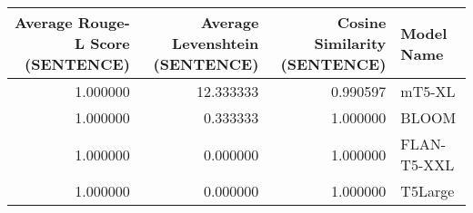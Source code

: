 \begin{tabular}{rrrl}
\toprule
Average Rouge-L Score (SENTENCE) & Average Levenshtein (SENTENCE) & Cosine Similarity (SENTENCE) & Model Name \\
\midrule
1.000000 & 12.333333 & 0.990597 & mT5-XL \\
1.000000 & 0.333333 & 1.000000 & BLOOM \\
1.000000 & 0.000000 & 1.000000 & FLAN-T5-XXL \\
1.000000 & 0.000000 & 1.000000 & T5Large \\
\bottomrule
\end{tabular}
